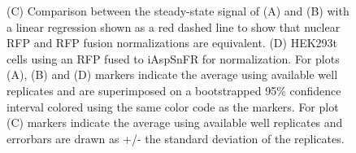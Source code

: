 \documentclass[9pt,lineno]{elife}
\begin{document}
\begin{figure}[ht!]
{(C) Comparison between the steady-state signal of (A) and (B) with a linear regression shown as a red dashed line to show that nuclear RFP and RFP fusion normalizations are equivalent.
(D) HEK293t cells using an RFP fused to iAspSnFR for normalization.
For plots (A), (B) and (D) markers indicate the average using available well replicates and are superimposed on a bootstrapped 95\% confidence interval colored using the same color code as the markers.
For plot (C) markers indicate the average using available well replicates and errorbars are drawn as +/- the standard deviation of the replicates.
}{}\label{figsupp:f2S1}
\label{figsupp:f2S2}
\end{figure}
\end{document}
